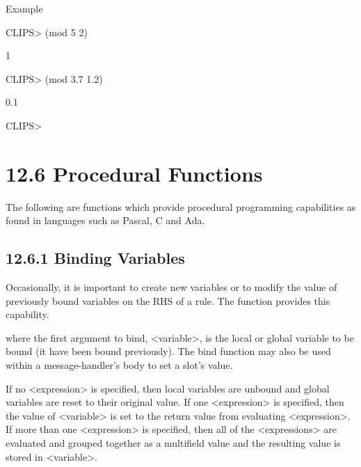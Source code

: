 \documentclass[letterpaper,10pt,english]{sphinxmanual}
\begin{document}

\begin{sphinxVerbatim}[commandchars=\\\{\}]
  
\end{sphinxVerbatim}

Example

CLIPS\textgreater{} (mod 5 2)

1

CLIPS\textgreater{} (mod 3.7 1.2)

0.1

CLIPS\textgreater{}


\section{12.6 Procedural Functions}
\label{\detokenize{actions:procedural-functions}}
The following are functions which provide procedural programming
capabilities as found in languages such as Pascal, C and Ada.


\subsection{12.6.1 Binding Variables}
\label{\detokenize{actions:binding-variables}}
Occasionally, it is important to create new variables or to modify the
value of previously bound variables on the RHS of a rule. The 
function provides this capability.


\begin{sphinxVerbatim}[commandchars=\\\{\}]
  
\end{sphinxVerbatim}

where the first argument to bind, \textless{}variable\textgreater{}, is the local or global
variable to be bound (it  have been bound previously). The bind
function may also be used within a message-handler’s body to set a
slot’s value.

If no \textless{}expression\textgreater{} is specified, then local variables are unbound and
global variables are reset to their original value. If one \textless{}expression\textgreater{}
is specified, then the value of \textless{}variable\textgreater{} is set to the return value
from evaluating \textless{}expression\textgreater{}. If more than one \textless{}expression\textgreater{} is
specified, then all of the \textless{}expressions\textgreater{} are evaluated and grouped
together as a multifield value and the resulting value is stored in
\textless{}variable\textgreater{}.
\end{document}
